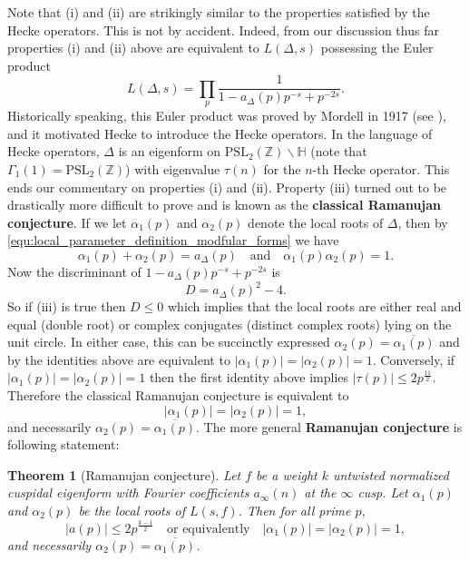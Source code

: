 \documentclass[12pt]{book}
\newtheorem{theorem}{Theorem}[section]
\theoremstyle{definition}\newframedtheorem{method}{Method}
\newcommand{\PSL}{\mathrm{PSL}}
\newcommand{\Z}{\mathbb{Z}}
\renewcommand{\H}{\mathbb{H}}
\renewcommand{\a}{\alpha}
\newcommand{\G}{\Gamma}
\newcommand{\<}{\langle}
\renewcommand{\>}{\rangle}
\newcommand{\conj}{\overline}
\begin{document}
      Note that (i) and (ii) are strikingly similar to the properties satisfied by the Hecke operators. This is not by accident. Indeed, from our discussion thus far properties (i) and (ii) above are equivalent to $L(\Delta,s)$ possessing the Euler product
      \[
        L(\Delta,s) = \prod_{p}\frac{1}{1-a_{\Delta}(p)p^{-s}+p^{-2s}}.
      \]
      Historically speaking, this Euler product was proved by Mordell in 1917 (see \cite{mordell1917mr}), and it motivated Hecke to introduce the Hecke operators. In the language of Hecke operators, $\Delta$ is an eigenform on $\PSL_{2}(\Z)\backslash\H$ (note that $\G_{1}(1) = \PSL_{2}(\Z)$) with eigenvalue $\tau(n)$ for the $n$-th Hecke operator. This ends our commentary on properties (i) and (ii). Property (iii) turned out to be drastically more difficult to prove and is known as the \textbf{classical Ramanujan conjecture}. If we let $\a_{1}(p)$ and $\a_{2}(p)$ denote the local roots of $\Delta$, then by \cref{equ:local_parameter_definition_modfular_forms} we have
      \[
        \a_{1}(p)+\a_{2}(p) = a_{\Delta}(p) \quad \text{and} \quad \a_{1}(p)\a_{2}(p) = 1.
      \]
      Now the discriminant of $1-a_{\Delta}(p)p^{-s}+p^{-2s}$ is
      \[
        D = a_{\Delta}(p)^{2}-4.
      \]
      So if (iii) is true then $D \le 0$ which implies that the local roots are either real and equal (double root) or complex conjugates (distinct complex roots) lying on the unit circle. In either case, this can be succinctly expressed $\a_{2}(p) = \conj{\a_{1}(p)}$ and by the identities above are equivalent to $|\a_{1}(p)| = |\a_{2}(p)| = 1$. Conversely, if $|\a_{1}(p)| = |\a_{2}(p)| = 1$ then the first identity above implies $|\tau(p)| \le 2p^{\frac{11}{2}}$. Therefore the classical Ramanujan conjecture is equivalent to
      \[
        |\a_{1}(p)| = |\a_{2}(p)| = 1,
      \]
      and necessarily $\a_{2}(p) = \conj{\a_{1}(p)}$. The more general \textbf{Ramanujan conjecture} is following statement:

      \begin{theorem}[Ramanujan conjecture]
        Let $f$ be a weight $k$ untwisted normalized cuspidal eigenform with Fourier coefficients $a_{\infty}(n)$ at the $\infty$ cusp. Let $\a_{1}(p)$ and $\a_{2}(p)$ be the local roots of $L(s,f)$. Then for all prime $p$,
        \[
          |a(p)| \le 2p^{\frac{k-1}{2}} \quad \text{or equivalently} \quad |\a_{1}(p)| = |\a_{2}(p)| = 1,
        \]
        and necessarily $\a_{2}(p) = \conj{\a_{1}(p)}$.
      \end{theorem}
\end{document}
